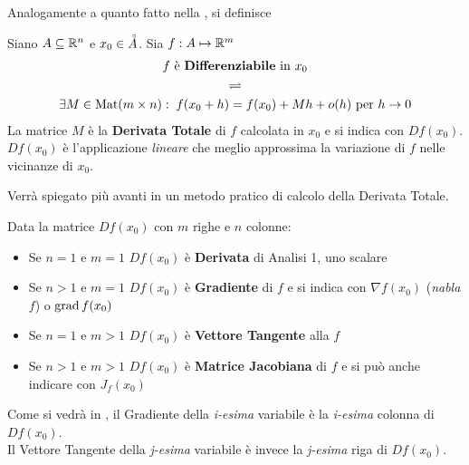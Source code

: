 \noindent Analogamente a quanto fatto nella , si definisce
\begin{definition}[Differenziale]
	\label{def:differenz}
	Siano $A \subseteq \mathbb{R}^n$ e $x_0 \in \accentset{\circ}{A}$. Sia $f: A \mapsto \mathbb{R}^m$
	\begin{equation*}
		\begin{gathered}
			f \text{ è \textbf{Differenziabile} in } x_0\\
			\rightleftharpoons\\
			\exists M \in \operatorname{Mat} (m \times n):\; f(x_0 + h) = f(x_0) + Mh + o(h) \text{ per } h \to 0
		\end{gathered}
	\end{equation*}
	La matrice $M$ è la \textbf{Derivata Totale} di $f$ calcolata in $x_0$ e si indica con $Df(x_0)$. $Df(x_0)$ è l'applicazione \textit{lineare} che meglio approssima la variazione di $f$ nelle vicinanze di $x_0$.
	\begin{note}
		Verrà spiegato più avanti in  un metodo pratico di calcolo della Derivata Totale.
	\end{note}
\end{definition}
\begin{observation}
	\label{obs:matr_deriv_tot}
	Data la matrice $Df(x_0)$ con $m$ righe e $n$ colonne:
	\begin{itemize}
		\item Se $n = 1$ e $m = 1$ $Df(x_0)$ è \textbf{Derivata} di Analisi 1, uno scalare
		\item Se $n > 1$ e $m = 1$ $Df(x_0)$ è \textbf{Gradiente} di $f$ e si indica con $\nabla f(x_0)$ (\textit{nabla} $f$) o $\operatorname{grad} f(x_0)$
		\item Se $n = 1$ e $m > 1$ $Df(x_0)$ è \textbf{Vettore Tangente} alla $f$
		\item Se $n > 1$ e $m > 1$ $Df(x_0)$ è \textbf{Matrice Jacobiana} di $f$ e si può anche indicare con $J_f(x_0)$
	\end{itemize}
	Come si vedrà in , il Gradiente della \textit{i-esima} variabile è la \textit{i-esima} colonna di $Df(x_0)$.\\
	Il Vettore Tangente della \textit{j-esima} variabile è invece la \textit{j-esima} riga di $Df(x_0)$.
\end{observation}
